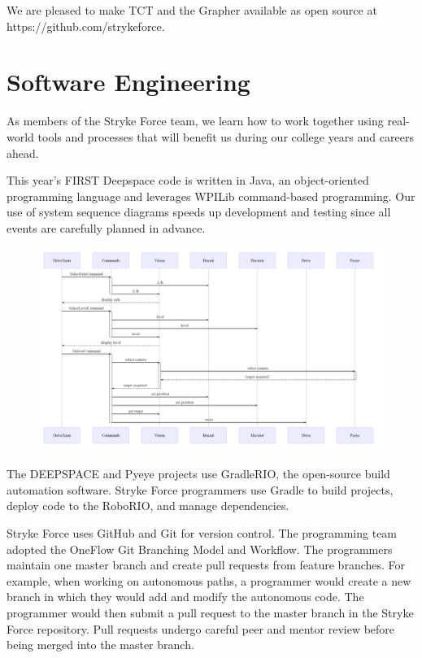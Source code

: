 \documentclass[10pt,tumble]{leaflet}
\begin{document}
We are pleased to make TCT and the Grapher available as open source at https://github.com/strykeforce.

\section{Software Engineering}

As members of the Stryke Force team, we learn how to work together using real-world tools and processes that will benefit us during our college years and careers ahead.

This year’s FIRST Deepspace code is written in Java, an object-oriented programming language and leverages WPILib command-based programming. Our use of system sequence diagrams speeds up development and testing since all events are carefully planned in advance.

\begin{figure}[H]
	\centering
	\includegraphics[scale=0.18]{assets/mermaid}
\end{figure}

The DEEPSPACE and Pyeye projects use GradleRIO, the open-source build automation software. Stryke Force programmers use Gradle to build projects, deploy code to the RoboRIO, and manage dependencies.

Stryke Force uses GitHub and Git for version control. The programming team adopted the OneFlow Git Branching Model and Workflow.  The programmers maintain one master branch and create pull requests from feature branches.  For example, when working on autonomous paths, a programmer would create a new branch in which they would add and modify the autonomous code.  The programmer would then submit a pull request to the master branch in the Stryke Force repository. Pull requests undergo careful peer and mentor review before being merged into the master branch.
\end{document}
